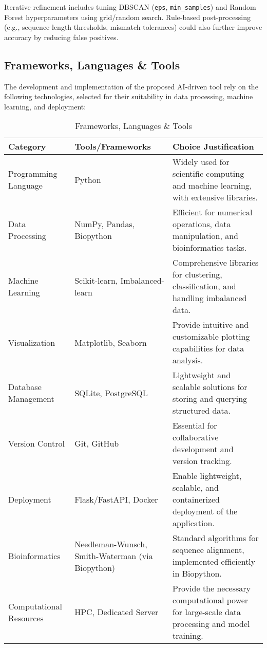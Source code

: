 Iterative refinement includes tuning DBSCAN (\texttt{eps}, \texttt{min\_samples}) and Random Forest hyperparameters using grid/random search. Rule-based post-processing (e.g., sequence length thresholds, mismatch tolerances) could also further improve accuracy by reducing false positives.

\subsection{Frameworks, Languages \& Tools}
The development and implementation of the proposed AI-driven tool rely on the following technologies, selected for their suitability in data processing, machine learning, and deployment:

\begin{table}[h]
\centering
\caption{Frameworks, Languages \& Tools}
\label{tab:frameworks}
\begin{tabular}{|p{3.5cm}|p{3.5cm}|p{6cm}|}
\hline
\textbf{Category} & \textbf{Tools/Frameworks} & \textbf{Choice Justification} \\ \hline
Programming Language & Python & Widely used for scientific computing and machine learning, with extensive libraries. \\ \hline
Data Processing & NumPy, Pandas, Biopython & Efficient for numerical operations, data manipulation, and bioinformatics tasks. \\ \hline
Machine Learning & Scikit-learn, Imbalanced-learn & Comprehensive libraries for clustering, classification, and handling imbalanced data. \\ \hline
Visualization & Matplotlib, Seaborn & Provide intuitive and customizable plotting capabilities for data analysis. \\ \hline
Database Management & SQLite, PostgreSQL & Lightweight and scalable solutions for storing and querying structured data. \\ \hline
Version Control & Git, GitHub & Essential for collaborative development and version tracking. \\ \hline
Deployment & Flask/FastAPI, Docker & Enable lightweight, scalable, and containerized deployment of the application. \\ \hline
Bioinformatics & Needleman-Wunsch, Smith-Waterman (via Biopython) & Standard algorithms for sequence alignment, implemented efficiently in Biopython. \\ \hline
Computational Resources & HPC, Dedicated Server & Provide the necessary computational power for large-scale data processing and model training. \\ \hline
\end{tabular}
\end{table}


